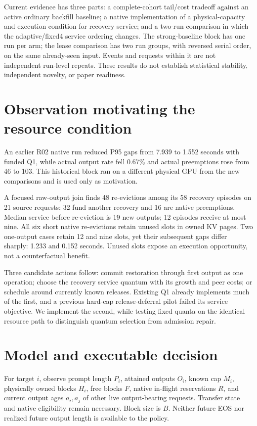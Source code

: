 \documentclass[10pt]{article}
\begin{document}
Current evidence has three parts: a complete-cohort tail/cost tradeoff against an active ordinary backfill baseline; a native implementation of a physical-capacity and execution condition for recovery service; and a two-run comparison in which the adaptive/fixed4 service ordering changes. The strong-baseline block has one run per arm; the lease comparison has two run groups, with reversed serial order, on the same already-seen input. Events and requests within it are not independent run-level repeats. These results do not establish statistical stability, independent novelty, or paper readiness.

\section{Observation motivating the resource condition}
An earlier R02 native run reduced P95 gaps from 7.939 to 1.552 seconds with funded Q1, while actual output rate fell 0.67\% and actual preemptions rose from 46 to 103. This historical block ran on a different physical GPU from the new comparisons and is used only as motivation.

A focused raw-output join finds 48 re-evictions among its 58 recovery episodes on 21 source requests: 32 fund another recovery and 16 are native preemptions. Median service before re-eviction is 19 new outputs; 12 episodes receive at most nine. All six short native re-evictions retain unused slots in owned KV pages. Two one-output cases retain 12 and nine slots, yet their subsequent gaps differ sharply: 1.233 and 0.152 seconds. Unused slots expose an execution opportunity, not a counterfactual benefit.

Three candidate actions follow: commit restoration through first output as one operation; choose the recovery service quantum with its growth and peer costs; or schedule around currently known releases. Existing Q1 already implements much of the first, and a previous hard-cap release-deferral pilot failed its service objective. We implement the second, while testing fixed quanta on the identical resource path to distinguish quantum selection from admission repair.

\section{Model and executable decision}
For target $i$, observe prompt length $P_i$, attained outputs $O_i$, known cap $M_i$, physically owned blocks $H_i$, free blocks $F$, native in-flight reservations $R$, and current output ages $a_i,a_j$ of other live output-bearing requests. Transfer state and native eligibility remain necessary. Block size is $B$. Neither future EOS nor realized future output length is available to the policy.
\end{document}
